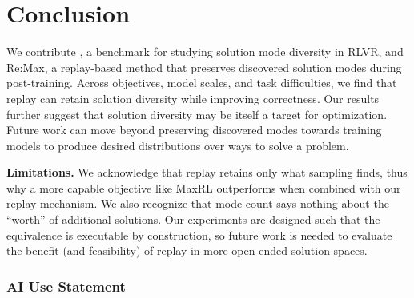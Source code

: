 

\section{Conclusion}
\label{sec:conclusion}
\label{sec:discussion}
\label{sec:limitations}



We contribute \mb{}, a benchmark for studying solution mode diversity in RLVR, and Re:Max, a replay-based method that preserves discovered solution modes during post-training. 
Across objectives, model scales, and task difficulties, we find that replay can retain solution diversity while improving correctness. 
Our results further suggest that solution diversity may be itself a target for optimization. Future work can move beyond preserving discovered modes towards training models to produce desired distributions over ways to solve a problem.




\textbf{Limitations.} We acknowledge that replay retains only what sampling finds, thus why a more capable objective like MaxRL outperforms when combined with our replay mechanism. We also recognize that mode count says nothing about the ``worth'' of additional solutions. Our experiments are designed such that the equivalence is executable by construction, so future work is needed to evaluate the benefit (and feasibility) of replay in more open-ended solution spaces. 

\clearpage
\subsubsection*{AI Use Statement}
\label{sec:ai-use}

